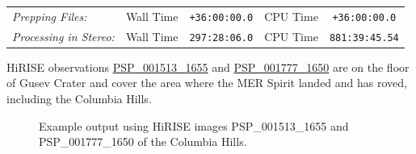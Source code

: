 \begin{tabular}{ l r c r c}
\textit{Prepping Files:}       & Wall Time & \texttt{+36:00:00.0} & CPU Time & \texttt{+36:00:00.0} \\
\textit{Processing in Stereo:} & Wall Time & \texttt{297:28:06.0} & CPU Time & \texttt{881:39:45.54} \\
\end{tabular}

\ac{HiRISE} observations
\href{http://hirise.lpl.arizona.edu/PSP_001513_1655}{PSP\_001513\_1655} and
\href{http://hirise.lpl.arizona.edu/PSP_001777_1650}{PSP\_001777\_1650}
are on the floor of Gusev Crater and cover the area where the \ac{MER} 
Spirit landed and has roved, including the Columbia Hills.

\begin{figure}[h!]
\centering
  \hfil
\caption{Example output using HiRISE images PSP\_001513\_1655 and
  PSP\_001777\_1650 of the Columbia Hills.}
\label{fig:hirise_chills_example}
\end{figure}

